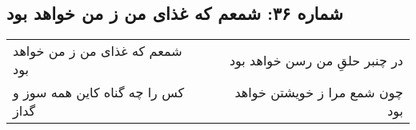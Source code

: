 \begin{center}
\section*{شماره ۳۶: شمعم که غذای من ز من خواهد بود}
\label{sec:036}
\begin{longtable}{l p{0.5cm} r}
شمعم که غذای من ز من خواهد بود
&&
در چنبر حلقِ من رسن خواهد بود
\\
کس را چه گناه کاین همه سوز و گداز
&&
چون شمع مرا ز خویشتن خواهد بود
\\
\end{longtable}
\end{center}
